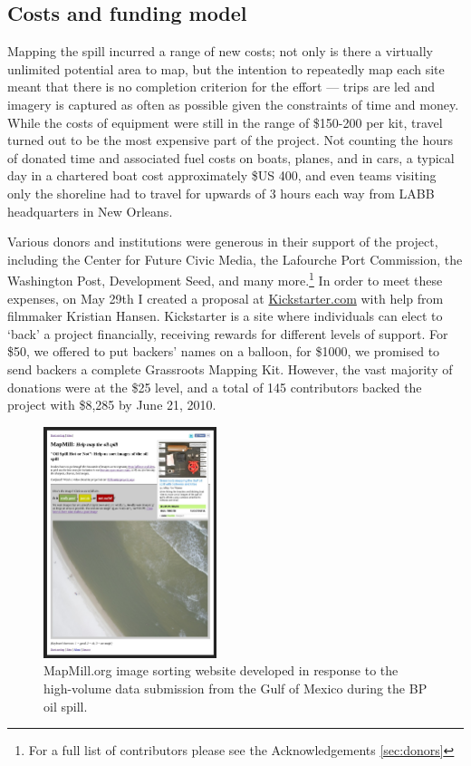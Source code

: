\documentclass[11pt,oneside,notitlepage]{report}
\begin{document}
\subsection{Costs and funding model}
\label{subsec:kickstarter}

Mapping the spill incurred a range of new costs; not only is there a virtually unlimited potential area to map, but the intention to repeatedly map each site meant that there is no completion criterion for the effort --- trips are led and imagery is captured as often as possible given the constraints of time and money. While the costs of equipment were still in the range of \$150-200 per kit, travel turned out to be the most expensive part of the project. Not counting the hours of donated time and associated fuel costs on boats, planes, and in cars, a typical day in a chartered boat cost approximately \$US 400, and even teams visiting only the shoreline had to travel for upwards of 3 hours each way from \ac{LABB} headquarters in New Orleans. 

Various donors and institutions were generous in their support of the project, including the Center for Future Civic Media, the Lafourche Port Commission, the Washington Post, Development Seed, and many more.\footnote{For a full list of contributors please see the Acknowledgements \ref{sec:donors}} In order to meet these expenses, on May 29th I created a proposal at \href{http://kickstarter.com}{Kickstarter.com} with help from filmmaker Kristian Hansen. Kickstarter is a site where individuals can elect to `back' a project financially, receiving rewards for different levels of support. For \$50, we offered to put backers' names on a balloon, for \$1000, we promised to send backers a complete Grassroots Mapping Kit. However, the vast majority of donations were at the \$25 level, and a total of 145 contributors backed the project with \$8,285 by June 21, 2010.

\begin{figure}
	\begin{flushright}
		\includegraphics[width=0.45\textwidth]{images/mapmill.png}
		\caption{MapMill.org image sorting website developed in response to the high-volume data submission from the Gulf of Mexico during the BP oil spill.}
	\end{flushright}
\end{figure}
\end{document}
